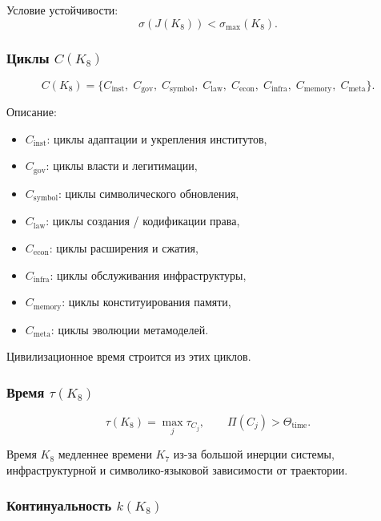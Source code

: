 Условие устойчивости:
\[
\sigma(J(K_8)) < \sigma_{\max}(K_8).
\]

\subsubsection{Циклы \texorpdfstring{$C(K_8)$}{$C(K_8)$}}

\[
C(K_8)=
\{
C_{\mathrm{inst}},\;
C_{\mathrm{gov}},\;
C_{\mathrm{symbol}},\;
C_{\mathrm{law}},\;
C_{\mathrm{econ}},\;
C_{\mathrm{infra}},\;
C_{\mathrm{memory}},\;
C_{\mathrm{meta}}
\}.
\]

Описание:
\begin{itemize}
    \item $C_{\mathrm{inst}}$: циклы адаптации и укрепления институтов,
    \item $C_{\mathrm{gov}}$: циклы власти и легитимации,
    \item $C_{\mathrm{symbol}}$: циклы символического обновления,
    \item $C_{\mathrm{law}}$: циклы создания / кодификации права,
    \item $C_{\mathrm{econ}}$: циклы расширения и сжатия,
    \item $C_{\mathrm{infra}}$: циклы обслуживания инфраструктуры,
    \item $C_{\mathrm{memory}}$: циклы конституирования памяти,
    \item $C_{\mathrm{meta}}$: циклы эволюции метамоделей.
\end{itemize}

Цивилизационное время строится из этих циклов.

\subsubsection{Время \texorpdfstring{$\tau(K_8)$}{$\tau(K_8)$}}

\[
\tau(K_8)=\max_j \tau_{C_j},
\qquad
\Pi(C_j) > \Theta_{\mathrm{time}}.
\]

Время $K_8$ медленнее времени $K_7$ из-за большой инерции системы,
инфраструктурной и символико-языковой зависимости от траектории.

\subsubsection{Континуальность \texorpdfstring{$k(K_8)$}{$k(K_8)$}}

